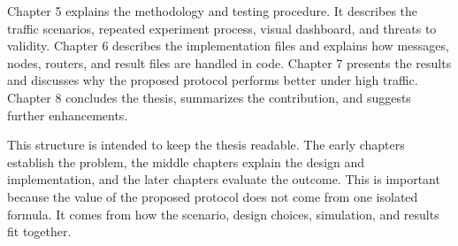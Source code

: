 Chapter 5 explains the methodology and testing procedure. It describes the traffic scenarios, repeated experiment process, visual dashboard, and threats to validity. Chapter 6 describes the implementation files and explains how messages, nodes, routers, and result files are handled in code. Chapter 7 presents the results and discusses why the proposed protocol performs better under high traffic. Chapter 8 concludes the thesis, summarizes the contribution, and suggests further enhancements.

This structure is intended to keep the thesis readable. The early chapters establish the problem, the middle chapters explain the design and implementation, and the later chapters evaluate the outcome. This is important because the value of the proposed protocol does not come from one isolated formula. It comes from how the scenario, design choices, simulation, and results fit together.
